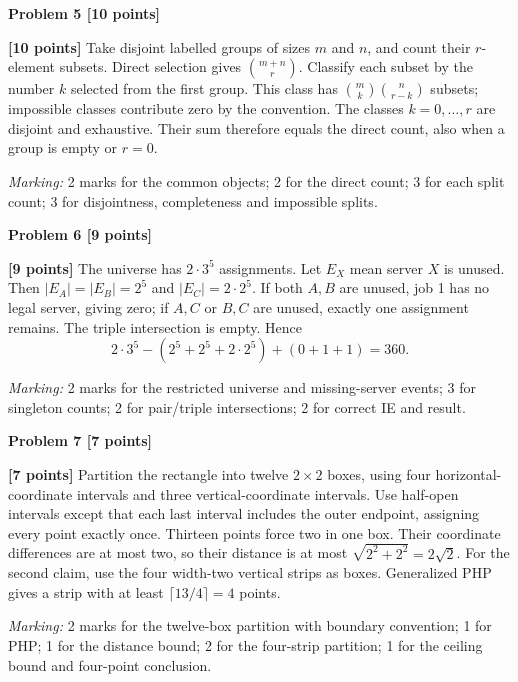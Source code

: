 \documentclass[12pt,letterpaper]{article}
\newcommand{\problemheading}[2][5\baselineskip]{\Needspace{#1}\par\noindent\hspace*{-0.625in}\textbf{#2}\par\nobreak\vspace{0.3em}}
\begin{document}
\vspace{0.65em}
\problemheading[\dimexpr 3\baselineskip+4\baselineskip\relax]{Problem 5 [10 points]}
\begin{description}[font=\normalfont,leftmargin=1.2em,labelsep=0.4em]
\item[] \textbf{[10 points]} Take disjoint labelled groups of sizes $m$ and $n$, and count their $r$-element subsets. Direct selection gives $\binom{m+n}{r}$. Classify each subset by the number $k$ selected from the first group. This class has $\binom mk\binom n{r-k}$ subsets; impossible classes contribute zero by the convention. The classes $k=0,\ldots,r$ are disjoint and exhaustive. Their sum therefore equals the direct count, also when a group is empty or $r=0$.
\par\textit{Marking:} 2 marks for the common objects; 2 for the direct count; 3 for each split count; 3 for disjointness, completeness and impossible splits.
\end{description}
\vspace{0.65em}
\problemheading[\dimexpr 3\baselineskip+4\baselineskip\relax]{Problem 6 [9 points]}
\begin{description}[font=\normalfont,leftmargin=1.2em,labelsep=0.4em]
\item[] \textbf{[9 points]} The universe has $2\cdot3^5$ assignments. Let $E_X$ mean server $X$ is unused. Then $|E_A|=|E_B|=2^5$ and $|E_C|=2\cdot2^5$. If both $A,B$ are unused, job 1 has no legal server, giving zero; if $A,C$ or $B,C$ are unused, exactly one assignment remains. The triple intersection is empty. Hence\[2\cdot3^5-(2^5+2^5+2\cdot2^5)+(0+1+1)=360.\]
\par\textit{Marking:} 2 marks for the restricted universe and missing-server events; 3 for singleton counts; 2 for pair/triple intersections; 2 for correct IE and result.
\end{description}
\vspace{0.65em}
\problemheading[\dimexpr 3\baselineskip+4\baselineskip\relax]{Problem 7 [7 points]}
\begin{description}[font=\normalfont,leftmargin=1.2em,labelsep=0.4em]
\item[] \textbf{[7 points]} Partition the rectangle into twelve $2\times2$ boxes, using four horizontal-coordinate intervals and three vertical-coordinate intervals. Use half-open intervals except that each last interval includes the outer endpoint, assigning every point exactly once. Thirteen points force two in one box. Their coordinate differences are at most two, so their distance is at most $\sqrt{2^2+2^2}=2\sqrt2$. For the second claim, use the four width-two vertical strips as boxes. Generalized PHP gives a strip with at least $\lceil13/4\rceil=4$ points.
\par\textit{Marking:} 2 marks for the twelve-box partition with boundary convention; 1 for PHP; 1 for the distance bound; 2 for the four-strip partition; 1 for the ceiling bound and four-point conclusion.
\end{description}
\end{document}
